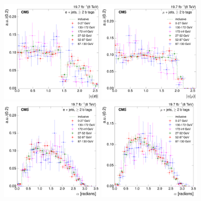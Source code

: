 \begin{figure}[hbtp]
    \centering
     \includegraphics[width=0.45\textwidth]{Chapters/07_08_09_Analysis/Images/8TeV/fit_variables/electron/MET/electron_absolute_eta/vjets/MET_electron_absolute_eta_2orMoreBtags_VJets_template_comparison}\hfill
     \includegraphics[width=0.45\textwidth]{Chapters/07_08_09_Analysis/Images/8TeV/fit_variables/muon/MET/muon_absolute_eta/vjets/MET_muon_absolute_eta_2orMoreBtags_VJets_template_comparison}\\
     \includegraphics[width=0.45\textwidth]{Chapters/07_08_09_Analysis/Images/8TeV/fit_variables/electron/MET/angle_bl/vjets/MET_angle_bl_2orMoreBtags_VJets_template_comparison}\hfill
     \includegraphics[width=0.45\textwidth]{Chapters/07_08_09_Analysis/Images/8TeV/fit_variables/muon/MET/angle_bl/vjets/MET_angle_bl_2orMoreBtags_VJets_template_comparison}\\

\end{figure}
